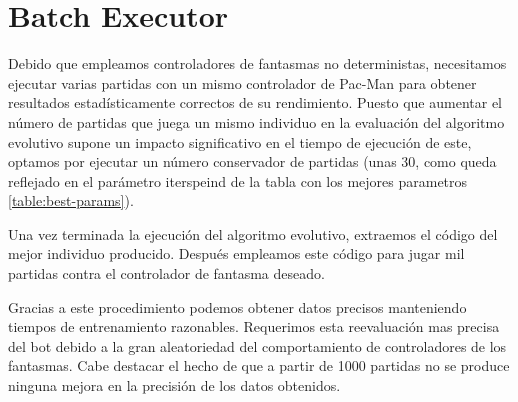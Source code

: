 \section{Batch Executor}
Debido que empleamos controladores de fantasmas no deterministas, necesitamos ejecutar varias partidas con un mismo controlador de Pac-Man para obtener resultados estadísticamente correctos de su rendimiento. Puesto que aumentar el número de partidas que juega un mismo individuo en la evaluación del algoritmo evolutivo supone un impacto significativo en el tiempo de ejecución de este, optamos por ejecutar un número conservador de partidas (unas 30, como queda reflejado en el parámetro iterspeind de la tabla con los mejores parametros \ref{table:best-params}).
 
Una vez terminada la ejecución del algoritmo evolutivo, extraemos el código del mejor individuo producido. Después empleamos este código para jugar mil partidas contra el controlador de fantasma deseado.
 
Gracias a este procedimiento podemos obtener datos precisos manteniendo tiempos de entrenamiento razonables. Requerimos esta reevaluación mas precisa del bot debido a la gran aleatoriedad del comportamiento de controladores de los fantasmas. Cabe destacar el hecho de que a partir de 1000 partidas no se produce ninguna mejora en la precisión de los datos obtenidos.
